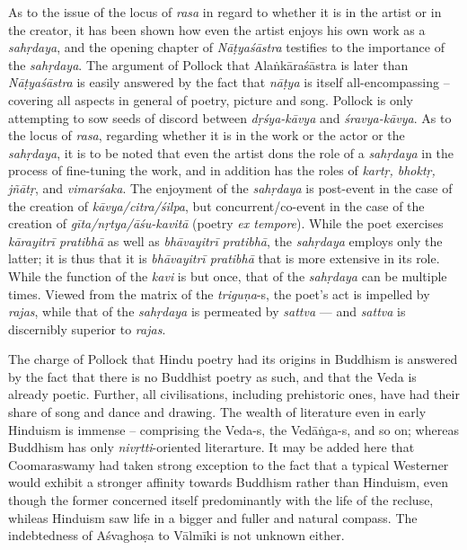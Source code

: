 As to the issue of the locus of \textsl{rasa} in regard to whether it is in the artist or in the creator, it has been shown how even the artist enjoys his own work as a \textsl{sahṛdaya}, and the opening chapter of \textsl{Nāṭyaśāstra} testifies to the importance of the \textsl{sahṛdaya}. The argument of Pollock that Alaṅkāraśāstra is later than \textsl{Nāṭyaśāstra} is easily answered by the fact that \textsl{nāṭya} is itself all-encompassing -- covering all aspects in general of poetry, picture and song. Pollock is only attempting to sow seeds of discord between \textsl{dṛśya-kāvya} and \textsl{śravya-kāvya}. As to the locus of \textsl{rasa}, regarding whether it is in the work or the actor or the \textsl{sahṛdaya}, it is to be noted that even the artist dons the role of a \textsl{sahṛdaya} in the process of fine-tuning the work, and in addition has the roles of \textsl{kartṛ, bhoktṛ, jñātṛ}, and \textsl{vimarśaka}. The enjoyment of the \textsl{sahṛdaya} is post-event in the case of the creation of \textsl{kāvya/citra/śilpa}, but concurrent/co-event in the case of the creation of \textsl{gīta/nṛtya/āśu-kavitā} (poetry \textsl{ex tempore}). While the poet exercises \textsl{kārayitrī pratibhā} as well as \textsl{bhāvayitrī pratibhā}, the \textsl{sahṛdaya} employs only the latter; it is thus that it is \textsl{bhāvayitrī pratibhā} that is more extensive in its role. While the function of the \textsl{kavi} is but once, that of the \textsl{sahṛdaya} can be multiple times. Viewed from the matrix of the \textsl{triguṇa}-s, the poet's act is impelled by \textsl{rajas}, while that of the \textsl{sahṛdaya} is permeated by \textsl{sattva} --- and \textsl{sattva} is discernibly superior to \textsl{rajas}.

The charge of Pollock that Hindu poetry had its origins in Buddhism is answered by the fact that there is no Buddhist poetry as such, and that the Veda is already poetic. Further, all civilisations, including prehistoric ones, have had their share of song and dance and drawing. The wealth of literature even in early Hinduism is immense -- comprising the Veda-s, the Vedāṅga-s, and so on; whereas Buddhism has only \textsl{nivṛtti}-oriented literarture. It may be added here that Coomaraswamy had taken strong exception to the fact that a typical Westerner would exhibit a stronger affinity towards Buddhism rather than Hinduism, even though the former concerned itself predominantly with the life of the recluse, whileas Hinduism saw life in a bigger and fuller and natural compass. The indebtedness of Aśvaghoṣa to Vālmīki is not unknown either.

